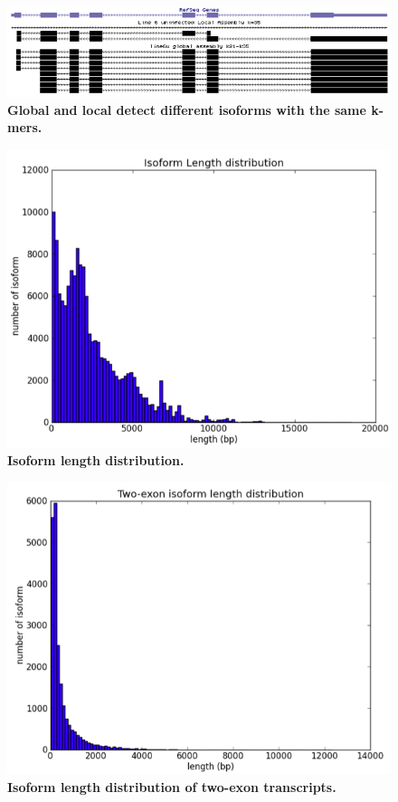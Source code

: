 \documentclass[10pt]{article}
\begin{document}
\begin{figure}[!ht]
\begin{center}
\includegraphics[width=5in]{figure5.png}
\end{center}
\caption{
{\bf Global and local detect different isoforms with the same k-mers.} 
}
\label{figure5}
\end{figure}

\begin{figure}[!ht]
\begin{center}
\includegraphics[width=5in]{figure6.png}
\end{center}
\caption{
{\bf Isoform length distribution.} 
}
\label{figure6}
\end{figure}

\begin{figure}[!ht]
\begin{center}
\includegraphics[width=5in]{figure7.png}
\end{center}
\caption{
{\bf Isoform length distribution of two-exon transcripts.} 
}
\label{figure7}
\end{figure}
\end{document}
